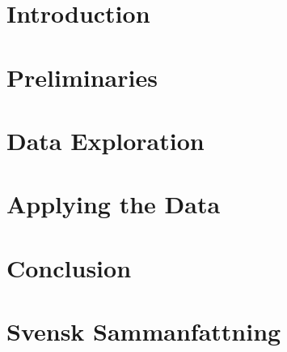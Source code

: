 \documentclass[a4paper, 12pt, oneside]{book}
\begin{document}
%

\chapter{Introduction}

\chapter{Preliminaries}
 

\chapter{Data Exploration}


\chapter{Applying the Data}


\chapter{Conclusion}


\chapter*{Svensk Sammanfattning}



\end{document}
